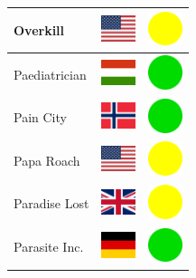 \documentclass[12pt, a4paper, twoside]{report}
\begin{document}
\begin{center}
\begin{longtable}{|p{5cm}|p{2cm}|p{2cm}|}
 Overkill                                                   & \includegraphics[width=1cm]{../4x3/us} &   \includegraphics[width=1cm]{../likes/m} \\ \hline
 Paediatrician                                              & \includegraphics[width=1cm]{../4x3/hu} &   \includegraphics[width=1cm]{../likes/y} \\ \hline
 Pain City                                                  & \includegraphics[width=1cm]{../4x3/no} &   \includegraphics[width=1cm]{../likes/y} \\ \hline
 Papa Roach                                                 & \includegraphics[width=1cm]{../4x3/us} &   \includegraphics[width=1cm]{../likes/m} \\ \hline
 Paradise Lost                                              & \includegraphics[width=1cm]{../4x3/gb} &   \includegraphics[width=1cm]{../likes/m} \\ \hline
 Parasite Inc.                                              & \includegraphics[width=1cm]{../4x3/de} &   \includegraphics[width=1cm]{../likes/y} \\ \hline

\end{longtable}
\end{center}
\end{document}
